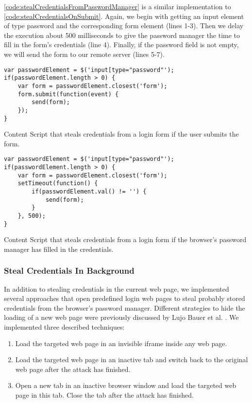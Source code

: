 	\autoref{code:stealCredentialsFromPasswordManager} is a similar implementation to \autoref{code:stealCredentialsOnSubmit}. Again, we begin with getting an input element of type password and the corresponding form element (lines 1-3). Then we delay the execution about 500 milliseconds to give the password manager the time to fill in the form's credentials (line 4). Finally, if the password field is not empty, we will send the form to our remote server (lines 5-7).
	
	\begin{code}
		\begin{lstlisting}	
var passwordElement = $('input[type="password"');
if(passwordElement.length > 0) {
	var form = passwordElement.closest('form');
	form.submit(function(event) {
		send(form);
	});
}
\end{lstlisting}
		\caption{Content Script that steals credentials from a login form if the user submits the form.}
		\label{code:stealCredentialsOnSubmit}
	\end{code}
	
	\begin{code}
		\begin{lstlisting}
var passwordElement = $('input[type="password"');
if(passwordElement.length > 0) {
	var form = passwordElement.closest('form');
	setTimeout(function() {
		if(passwordElement.val() != '') {
			send(form);
		}
	}, 500);
}
\end{lstlisting}
		\caption{Content Script that steals credentials from a login form if the browser's password manager has filled in the credentials.}
		\label{code:stealCredentialsFromPasswordManager}
	\end{code}
	
\subsubsection{Steal Credentials In Background}

	In addition to stealing credentials in the current web page, we implemented several approaches that open predefined login web pages to steal probably stored credentials from the browser's password manager. Different strategies to hide the loading of a new web page were previously discussed by Lujo Bauer et al. \cite{extensions:cns14}. We implemented three described techniques:
	
	\begin{enumerate}
		\item Load the targeted web page in an invisible iframe inside any web page.
		\item Load the targeted web page in an inactive tab and switch back to the original web page after the attack has finished.
		\item Open a new tab in an inactive browser window and load the targeted web page in this tab. Close the tab after the attack has finished.
	\end{enumerate} 
	
